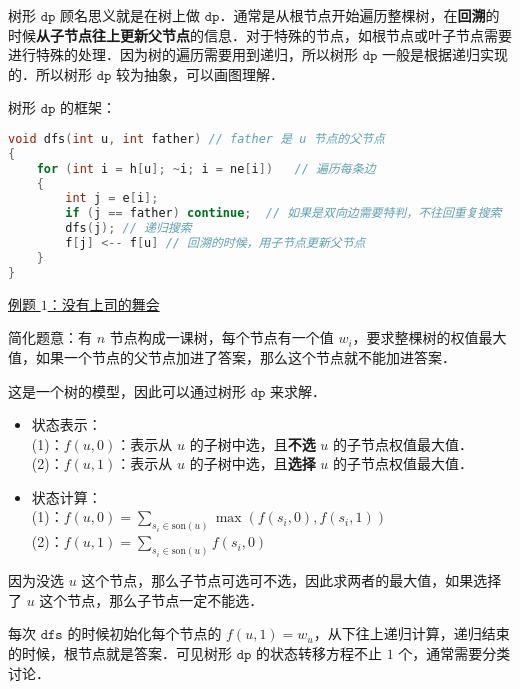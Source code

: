 


树形 $\texttt{dp}$ 顾名思义就是在树上做 $\texttt{dp}$．通常是从根节点开始遍历整棵树，在\textbf{回溯}的时候\textbf{从子节点往上更新父节点}的信息．对于特殊的节点，如根节点或叶子节点需要进行特殊的处理．因为树的遍历需要用到递归，所以树形 $\texttt{dp}$ 一般是根据递归实现的．所以树形 $\texttt{dp}$ 较为抽象，可以画图理解．

树形 $\texttt{dp}$ 的框架：

\begin{lstlisting}[language=cpp]
void dfs(int u, int father) // father 是 u 节点的父节点
{
    for (int i = h[u]; ~i; i = ne[i])   // 遍历每条边
    {
        int j = e[i];
        if (j == father) continue;  // 如果是双向边需要特判，不往回重复搜索
        dfs(j); // 递归搜索
        f[j] <-- f[u] // 回溯的时候，用子节点更新父节点
    }
}
\end{lstlisting}

\href{https://www.luogu.com.cn/problem/P1352}{例题 $1$：没有上司的舞会}

简化题意：有 $n$ 节点构成一课树，每个节点有一个值 $w_i$，要求整棵树的权值最大值，如果一个节点的父节点加进了答案，那么这个节点就不能加进答案．

这是一个树的模型，因此可以通过树形 $\texttt{dp}$ 来求解．

\begin{itemize}
\item 状态表示：\\
    (1)：$f(u, 0)$：表示从 $u$ 的子树中选，且\textbf{不选} $u$ 的子节点权值最大值．\\
    (2)：$f(u, 1)$：表示从 $u$ 的子树中选，且\textbf{选择} $u$ 的子节点权值最大值．

\end{itemize}

\begin{itemize}
\item 状态计算：\\
    (1)：$f(u, 0) = \sum_{s_i \in \text{son}(u)} \max(f(s_i, 0), f(s_i, 1))$ \\
    (2)：$f(u, 1) = \sum_{s_i \in \text{son}(u)} f(s_i, 0)$
\end{itemize}

因为没选 $u$ 这个节点，那么子节点可选可不选，因此求两者的最大值，如果选择了 $u$ 这个节点，那么子节点一定不能选．

每次 $\texttt{dfs}$ 的时候初始化每个节点的 $f(u, 1) = w_u$，从下往上递归计算，递归结束的时候，根节点就是答案．可见树形 $\texttt{dp}$ 的状态转移方程不止 $1$ 个，通常需要分类讨论．

